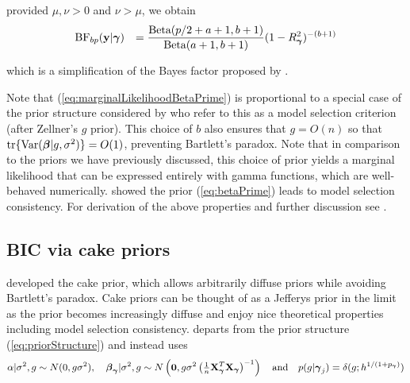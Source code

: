 \noindent provided $\mu,\nu>0$ and $\nu>\mu$, we obtain
\begin{equation}\label{eq:marginalLikelihoodBetaPrime}
	\begin{array}{rl}
		\displaystyle \mbox{BF}_{bp}({\bf y}|{\boldsymbol \gamma}) 
		& \displaystyle 
		=   
		\frac{\mbox{Beta}(p/2 + a + 1,b + 1)}{\mbox{Beta}(a+1,b+1)} (1-R_{\boldsymbol \gamma}^2)^{-(b + 1)}
	\end{array}
\end{equation}

\noindent which is a simplification of the Bayes factor proposed by
\cite{Maruyama2011}.


Note that (\ref{eq:marginalLikelihoodBetaPrime}) is proportional
to a special case of the prior structure considered by \cite{Maruyama2011}
who refer to this as a model selection criterion (after Zellner's $g$ prior). This choice of $b$ also ensures that $g = O(n)$ so that $\mbox{tr}\{\mbox{Var}({\boldsymbol \beta} | g, \sigma^2)\} = O(1)$, preventing Bartlett's paradox. 
Note that in comparison to the priors we have previously discussed, this choice of prior yields a marginal
likelihood that can be expressed entirely with gamma functions, which are well-behaved numerically.
\cite{Maruyama2011} showed the prior (\ref{eq:betaPrime}) leads to model
selection consistency.
For derivation of the above properties and further discussion see \cite{Maruyama2011}.




\subsection{BIC via cake priors}  

\noindent
\cite{OrmerodEtal2017} developed the cake prior, which allows arbitrarily diffuse priors while avoiding
Bartlett's paradox.
Cake priors
can be thought of as a Jefferys prior in the limit
as the prior becomes increasingly diffuse
and enjoy nice theoretical properties including model
selection consistency. \cite{OrmerodEtal2017} 
departs from the prior structure (\ref{eq:priorStructure}) and instead uses
\begin{equation}\label{eq:proirs2}
	\displaystyle \alpha|\sigma^2,g \sim N(0,g\sigma^2), \quad 
	\displaystyle {\boldsymbol\beta}_{\boldsymbol \gamma}|\sigma^2,g \sim N\left( {\bf 0},g\sigma^2\left( \tfrac{1}{n}{\bf X}_{\boldsymbol \gamma}^T{\bf X}_{\boldsymbol \gamma}\right)^{-1}\right)
	\quad \mbox{and} \quad
	p(g|{\boldsymbol \gamma}_j) = \delta(g; h^{1/(1 + p_{\boldsymbol \gamma})})
\end{equation}


